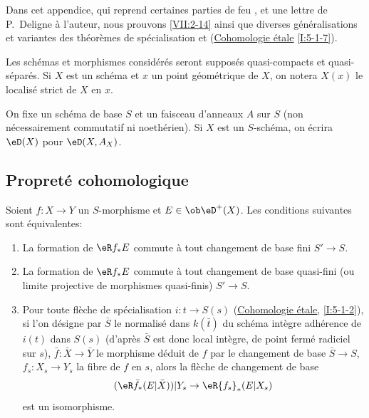 Dans cet appendice, qui reprend certaines parties de feu , et 
une lettre de P.\ Deligne à l'auteur, nous prouvons \ref{VII:2-14} ainsi que 
diverses généralisations et variantes des théorèmes de spécialisation 
 et (\hyperref[I]{Cohomologie étale} \ref{I:5-1-7}). 

Les schémas et morphismes considérés seront supposés quasi-compacts et 
quasi-séparés. Si $X$ est un schéma et $x$ un point géométrique de 
$X$, on notera $X(x)$ le localisé strict de $X$ en $x$. 

On fixe un schéma de base $S$ et un faisceau d'anneaux $A$ sur $S$ (non 
nécessairement commutatif ni noethérien). Si $X$ est un $S$-schéma, on 
écrira $\eD(X)$ pour $\eD(X,A_X)$. 





\subsection{Propreté cohomologique}\label{VII:5-1}





\begin{proposition}\label{VII:5-1-1}
Soient $f:X\to Y$ un $S$-morphisme et $E\in\ob \eD^+(X)$. Les conditions 
suivantes sont équivalentes: 
\begin{enumerate}[\indent (i)]
  \item La formation de $\eR f_\ast E$ commute à tout changement de base 
    fini $S'\to S$.
  \item La formation de $\eR f_\ast E$ commute à tout changement de base 
    quasi-fini (ou limite projective de morphismes quasi-finis) $S'\to S$. 
  \item Pour toute flèche de spécialisation $i:t\to S(s)$ 
    (\hyperref[I]{Cohomologie étale}, \ref{I:5-1-2}), si l'on désigne par 
    $\bar S$ le normalisé dans $k(\bar t)$ du schéma intègre 
    adhérence de $i(t)$ dans $S(s)$ (d'après 
     $\bar S$ est donc local 
    intègre, de point fermé radiciel sur $s$), $\bar f:\bar X\to \bar Y$ 
    le morphisme déduit de $f$ par le changement de base $\bar S\to S$, 
    $f_s:X_s\to Y_s$ la fibre de $f$ en $s$, alors la flèche de changement 
    de base 
    \[
      (\eR \bar f_\ast (E|\bar X))|Y_s \to \eR {f_s}_\ast(E|X_s) 
    \]
    est un isomorphisme. 
\end{enumerate}
\end{proposition}

